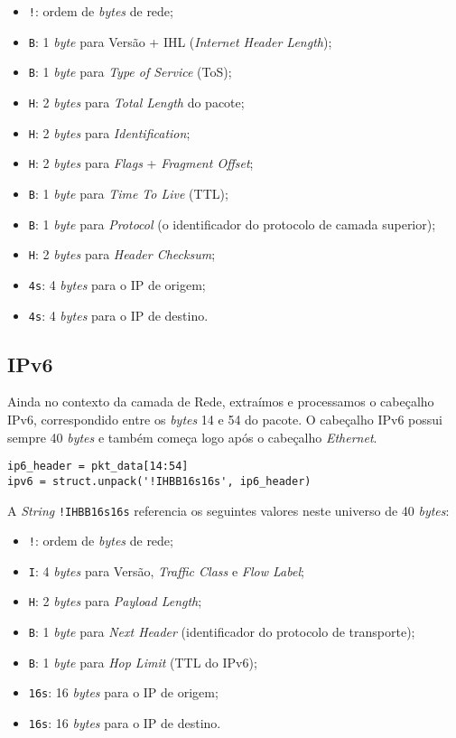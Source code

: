 \documentclass[12pt]{article}
\begin{document}
\begin{itemize}
    \item \texttt{!}: ordem de \emph{bytes} de rede;
    \item \texttt{B}: 1 \emph{byte} para Versão + IHL (\emph{Internet Header Length});
    \item \texttt{B}: 1 \emph{byte} para \emph{Type of Service} (ToS);
    \item \texttt{H}: 2 \emph{bytes} para \emph{Total Length} do pacote;
    \item \texttt{H}: 2 \emph{bytes} para \emph{Identification};
    \item \texttt{H}: 2 \emph{bytes} para \emph{Flags} + \emph{Fragment Offset};
    \item \texttt{B}: 1 \emph{byte} para \emph{Time To Live} (TTL);
    \item \texttt{B}: 1 \emph{byte} para \emph{Protocol} (o identificador do protocolo de camada superior);
    \item \texttt{H}: 2 \emph{bytes} para \emph{Header Checksum};
    \item \texttt{4s}: 4 \emph{bytes} para o IP de origem;
    \item \texttt{4s}: 4 \emph{bytes} para o IP de destino.
\end{itemize}

\subsection{IPv6}
Ainda no contexto da camada de Rede, extraímos e processamos o cabeçalho IPv6, correspondido entre os \emph{bytes} 14 e 54 do pacote. O cabeçalho IPv6 possui sempre 40 \emph{bytes} e também começa logo após o cabeçalho \emph{Ethernet}.

\begin{lstlisting}[style=vscode]
ip6_header = pkt_data[14:54]
ipv6 = struct.unpack('!IHBB16s16s', ip6_header)
\end{lstlisting}

\quad A \emph{String} \texttt{!IHBB16s16s} referencia os seguintes valores neste universo de 40 \emph{bytes}:

\begin{itemize}
    \item \texttt{!}: ordem de \emph{bytes} de rede;
    \item \texttt{I}: 4 \emph{bytes} para Versão, \emph{Traffic Class} e \emph{Flow Label};
    \item \texttt{H}: 2 \emph{bytes} para \emph{Payload Length};
    \item \texttt{B}: 1 \emph{byte} para \emph{Next Header} (identificador do protocolo de transporte);
    \item \texttt{B}: 1 \emph{byte} para \emph{Hop Limit} (TTL do IPv6);
    \item \texttt{16s}: 16 \emph{bytes} para o IP de origem;
    \item \texttt{16s}: 16 \emph{bytes} para o IP de destino.
\end{itemize}
\end{document}
